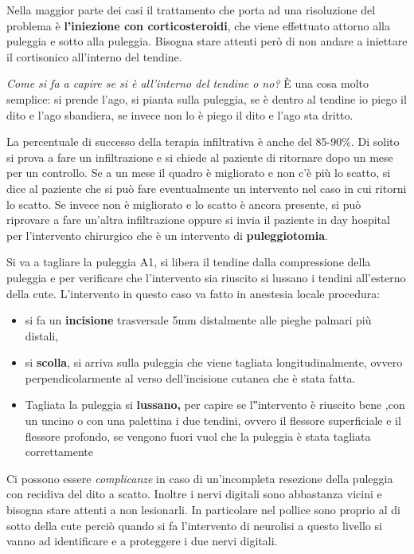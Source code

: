 \documentclass[]{article}
\begin{document}
Nella maggior parte dei casi il trattamento che porta ad una risoluzione
del problema è \textbf{l'iniezione con corticosteroidi}, che viene
effettuato attorno alla puleggia e sotto alla puleggia. Bisogna stare
attenti però di non andare a iniettare il cortisonico all'interno del
tendine.

\emph{Come si fa a capire se si è all'interno del tendine o no?} È una
cosa molto semplice: si prende l'ago, si pianta sulla puleggia, se è
dentro al tendine io piego il dito e l'ago sbandiera, se invece non lo è
piego il dito e l'ago sta dritto.

La percentuale di successo della terapia infiltrativa è anche del
85-90\%. Di solito si prova a fare un infiltrazione e si chiede al
paziente di ritornare dopo un mese per un controllo. Se a un mese il
quadro è migliorato e non c'è più lo scatto, si dice al paziente che si
può fare eventualmente un intervento nel caso in cui ritorni lo scatto.
Se invece non è migliorato e lo scatto è ancora presente, si può
riprovare a fare un'altra infiltrazione oppure si invia il paziente in
day hospital per l'intervento chirurgico che è un intervento di
\textbf{puleggiotomia}.

Si va a tagliare la puleggia A1, si libera il tendine dalla compressione
della puleggia e per verificare che l'intervento sia riuscito si lussano
i tendini all'esterno della cute. L'intervento in questo caso va fatto
in anestesia locale procedura:

\begin{itemize}
\item
  si fa un \textbf{incisione} trasversale 5mm distalmente alle pieghe
  palmari più distali,
\item
  si \textbf{scolla}, si arriva sulla puleggia che viene tagliata
  longitudinalmente, ovvero perpendicolarmente al verso dell'incisione
  cutanea che è stata fatta.
\item
  Tagliata la puleggia si \textbf{lussano,} per capire se l‟intervento è
  riuscito bene ,con un uncino o con una palettina i due tendini, ovvero
  il flessore superficiale e il flessore profondo, se vengono fuori vuol
  che la puleggia è stata tagliata correttamente
\end{itemize}

Ci possono essere \emph{\emph{complicanze}} in caso di un'incompleta
resezione della puleggia con recidiva del dito a scatto. Inoltre i nervi
digitali sono abbastanza vicini e bisogna stare attenti a non
lesionarli. In particolare nel pollice sono proprio al di sotto della
cute perciò quando si fa l'intervento di neurolisi a questo livello si
vanno ad identificare e a proteggere i due nervi digitali.
\end{document}
